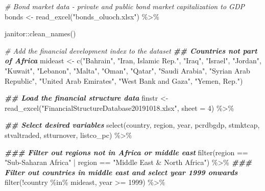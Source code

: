 \documentclass[a4paper,nobind]{templates/ociamthesis}
\newenvironment{Shaded}{\begin{snugshade}}{\end{snugshade}}
\newcommand{\AttributeTok}[1]{\textcolor[rgb]{0.77,0.63,0.00}{#1}}
\newcommand{\CommentTok}[1]{\textcolor[rgb]{0.56,0.35,0.01}{\textit{#1}}}
\newcommand{\DecValTok}[1]{\textcolor[rgb]{0.00,0.00,0.81}{#1}}
\newcommand{\DocumentationTok}[1]{\textcolor[rgb]{0.56,0.35,0.01}{\textbf{\textit{#1}}}}
\newcommand{\FunctionTok}[1]{\textcolor[rgb]{0.00,0.00,0.00}{#1}}
\newcommand{\NormalTok}[1]{#1}
\newcommand{\OtherTok}[1]{\textcolor[rgb]{0.56,0.35,0.01}{#1}}
\newcommand{\SpecialCharTok}[1]{\textcolor[rgb]{0.00,0.00,0.00}{#1}}
\newcommand{\StringTok}[1]{\textcolor[rgb]{0.31,0.60,0.02}{#1}}
\renewenvironment{Shaded}
{
  \vspace{10pt}%
  \begin{snugshade}%
}{%
  \end{snugshade}%
  \vspace{8pt}%
}
\begin{document}
\begin{Shaded}
\begin{Highlighting}[]
\CommentTok{\# Bond market data {-} private and public bond market capitalization to GDP}
\NormalTok{bonds }\OtherTok{\textless{}{-}} \FunctionTok{read\_excel}\NormalTok{(}\StringTok{"bonds\_oluoch.xlsx"}\NormalTok{) }\SpecialCharTok{\%\textgreater{}\%} 
  
\NormalTok{  janitor}\SpecialCharTok{::}\FunctionTok{clean\_names}\NormalTok{()}
\end{Highlighting}
\end{Shaded}

\begin{Shaded}
\begin{Highlighting}[]
\CommentTok{\# Add the financial development index to the dataset}
\DocumentationTok{\#\# Countries not part of Africa}
\NormalTok{mideast }\OtherTok{\textless{}{-}} \FunctionTok{c}\NormalTok{(}\StringTok{"Bahrain"}\NormalTok{, }\StringTok{"Iran, Islamic Rep."}\NormalTok{, }\StringTok{"Iraq"}\NormalTok{, }\StringTok{"Israel"}\NormalTok{, }\StringTok{"Jordan"}\NormalTok{, }\StringTok{"Kuwait"}\NormalTok{, }\StringTok{"Lebanon"}\NormalTok{, }\StringTok{"Malta"}\NormalTok{, }\StringTok{"Oman"}\NormalTok{, }\StringTok{"Qatar"}\NormalTok{, }\StringTok{"Saudi Arabia"}\NormalTok{, }\StringTok{"Syrian Arab Republic"}\NormalTok{, }\StringTok{"United Arab Emirates"}\NormalTok{, }\StringTok{"West Bank and Gaza"}\NormalTok{, }\StringTok{"Yemen, Rep."}\NormalTok{)}

\DocumentationTok{\#\# Load the financial structure data}
\NormalTok{finstr }\OtherTok{\textless{}{-}} \FunctionTok{read\_excel}\NormalTok{(}\StringTok{"FinancialStructureDatabase20191018.xlsx"}\NormalTok{, }\AttributeTok{sheet =} \DecValTok{4}\NormalTok{) }\SpecialCharTok{\%\textgreater{}\%} 
  
  \DocumentationTok{\#\# Select desired variables}
  \FunctionTok{select}\NormalTok{(country, region, year, pcrdbgdp, stmktcap, stvaltraded, stturnover, listco\_pc) }\SpecialCharTok{\%\textgreater{}\%} 
  
  \DocumentationTok{\#\#\# Filter out regions not in Africa or middle east}
  \FunctionTok{filter}\NormalTok{(region }\SpecialCharTok{==} \StringTok{"Sub{-}Saharan Africa"} \SpecialCharTok{|}\NormalTok{ region }\SpecialCharTok{==} \StringTok{"Middle East \& North Africa"}\NormalTok{) }\SpecialCharTok{\%\textgreater{}\%} 
  \DocumentationTok{\#\#\# Filter out countries in middle east and select year 1999 onwards}
  \FunctionTok{filter}\NormalTok{(}\SpecialCharTok{!}\NormalTok{country }\SpecialCharTok{\%in\%}\NormalTok{ mideast, year }\SpecialCharTok{\textgreater{}=} \DecValTok{1999}\NormalTok{) }\SpecialCharTok{\%\textgreater{}\%} 
  

\end{Highlighting}
\end{Shaded}
\end{document}
